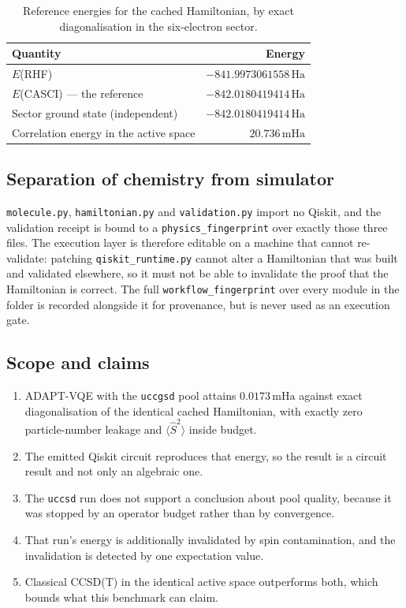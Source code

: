 \documentclass[11pt,a4paper]{article}
\newcommand{\mHa}{\ensuremath{\,\mathrm{mHa}}}
\newcommand{\Ha}{\ensuremath{\,\mathrm{Ha}}}
\newcommand{\Ssq}{\ensuremath{\langle \hat{S}^2 \rangle}}
\newcommand{\code}[1]{\texttt{\small #1}}
\begin{document}
\begin{table}[htbp]
\centering
\caption{Reference energies for the cached Hamiltonian, by exact
diagonalisation in the six-electron sector.}
\label{tab:refs}
\small
\begin{tabular}{lr}
\toprule
Quantity & Energy \\
\midrule
$E$(RHF)                          & $-841.9973061558\Ha$ \\
$E$(CASCI) --- the reference      & $-842.0180419414\Ha$ \\
Sector ground state (independent) & $-842.0180419414\Ha$ \\
Correlation energy in the active space & $20.736\mHa$ \\
\bottomrule
\end{tabular}
\end{table}

\subsection{Separation of chemistry from simulator}

\code{molecule.py}, \code{hamiltonian.py} and \code{validation.py} import no
Qiskit, and the validation receipt is bound to a \code{physics\_fingerprint}
over exactly those three files. The execution layer is therefore editable on a
machine that cannot re-validate: patching \code{qiskit\_runtime.py} cannot alter
a Hamiltonian that was built and validated elsewhere, so it must not be able to
invalidate the proof that the Hamiltonian is correct. The full
\code{workflow\_fingerprint} over every module in the folder is recorded
alongside it for provenance, but is never used as an execution gate.

\subsection{Scope and claims}

\begin{enumerate}[leftmargin=1.4em,itemsep=0.15em]
\item ADAPT-VQE with the \code{uccgsd} pool attains $0.0173\mHa$ against exact
  diagonalisation of the identical cached Hamiltonian, with exactly zero
  particle-number leakage and $\Ssq$ inside budget.
\item The emitted Qiskit circuit reproduces that energy, so the result is a
  circuit result and not only an algebraic one.
\item The \code{uccsd} run does not support a conclusion about pool quality,
  because it was stopped by an operator budget rather than by convergence.
\item That run's energy is additionally invalidated by spin contamination, and
  the invalidation is detected by one expectation value.
\item Classical CCSD(T) in the identical active space outperforms both, which
  bounds what this benchmark can claim.
\end{enumerate}
\end{document}
